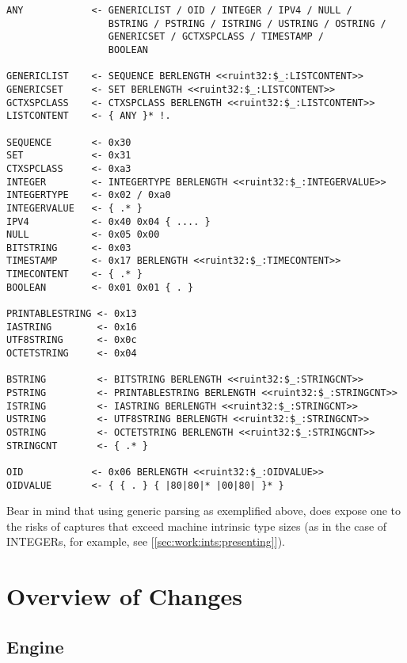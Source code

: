 \begin{changemargin}{-60mm}{0mm}
\begin{myquote}
\begin{verbatim}
ANY            <- GENERICLIST / OID / INTEGER / IPV4 / NULL /
                  BSTRING / PSTRING / ISTRING / USTRING / OSTRING /
                  GENERICSET / GCTXSPCLASS / TIMESTAMP /
                  BOOLEAN

GENERICLIST    <- SEQUENCE BERLENGTH <<ruint32:$_:LISTCONTENT>>
GENERICSET     <- SET BERLENGTH <<ruint32:$_:LISTCONTENT>>
GCTXSPCLASS    <- CTXSPCLASS BERLENGTH <<ruint32:$_:LISTCONTENT>>
LISTCONTENT    <- { ANY }* !.

SEQUENCE       <- 0x30
SET            <- 0x31
CTXSPCLASS     <- 0xa3
INTEGER        <- INTEGERTYPE BERLENGTH <<ruint32:$_:INTEGERVALUE>>
INTEGERTYPE    <- 0x02 / 0xa0
INTEGERVALUE   <- { .* }
IPV4           <- 0x40 0x04 { .... }
NULL           <- 0x05 0x00
BITSTRING      <- 0x03
TIMESTAMP      <- 0x17 BERLENGTH <<ruint32:$_:TIMECONTENT>>
TIMECONTENT    <- { .* }
BOOLEAN        <- 0x01 0x01 { . }

PRINTABLESTRING <- 0x13
IASTRING        <- 0x16
UTF8STRING      <- 0x0c
OCTETSTRING     <- 0x04

BSTRING         <- BITSTRING BERLENGTH <<ruint32:$_:STRINGCNT>>
PSTRING         <- PRINTABLESTRING BERLENGTH <<ruint32:$_:STRINGCNT>>
ISTRING         <- IASTRING BERLENGTH <<ruint32:$_:STRINGCNT>>
USTRING         <- UTF8STRING BERLENGTH <<ruint32:$_:STRINGCNT>>
OSTRING         <- OCTETSTRING BERLENGTH <<ruint32:$_:STRINGCNT>>
STRINGCNT       <- { .* }

OID            <- 0x06 BERLENGTH <<ruint32:$_:OIDVALUE>>
OIDVALUE       <- { { . } { |80|80|* |00|80| }* }
\end{verbatim}
\end{myquote}
\end{changemargin}

Bear in mind that using generic parsing as exemplified above, does expose 
one to the risks of captures that exceed machine intrinsic type sizes (as 
in the case of INTEGERs, for example, see [\ref{sec:work:ints:presenting}]).

\newpage
\section{Overview of Changes}

\subsection{Engine}

